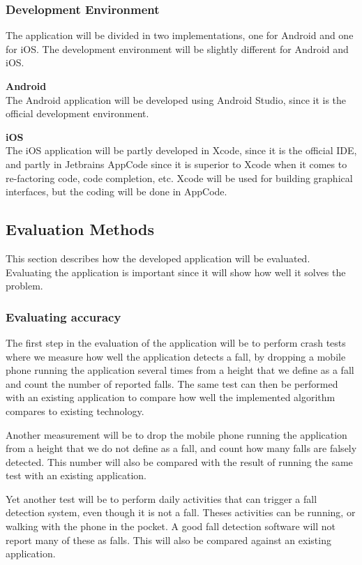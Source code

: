 \documentclass[12pt, a4paper, onecolumn]{article}
\newcommand{\parag}[1]{
	\textbf{#1} \hspace{0pt} \\
}
\begin{document}
	\subsubsection{Development Environment}
	
	The application will be divided in two implementations, one for Android and one for iOS. The development environment will be slightly different for Android and iOS. 
	
	\parag{Android}
	The Android application will be developed using Android Studio, since it is the official development environment.
	
	\parag{iOS}
	The iOS application will be partly developed in Xcode, since it is the official IDE, and partly in Jetbrains AppCode since it is superior to Xcode when it comes to re-factoring code, code completion, etc. Xcode will be used for building graphical interfaces, but the coding will be done in AppCode.
	
	\subsection{Evaluation Methods}
	
	This section describes how the developed application will be evaluated. Evaluating the application is important since it will show how well it solves the problem.
	
	\subsubsection{Evaluating accuracy}
	
	The first step in the evaluation of the application will be to perform crash tests where we measure how well the application detects a fall, by dropping a mobile phone running the application several times from a height that we define as a fall and count the number of reported falls. The same test can then be performed with an existing application to compare how well the implemented algorithm compares to existing technology.
	
	Another measurement will be to drop the mobile phone running the application from a height that we do not define as a fall, and count how many falls are falsely detected. This number will also be compared with the result of running the same test with an existing application.
	
	Yet another test will be to perform daily activities that can trigger a fall detection system, even though it is not a fall. Theses activities can be running, or walking with the phone in the pocket. A good fall detection software will not report many of these as falls. This will also be compared against an existing application.
	
\end{document}
